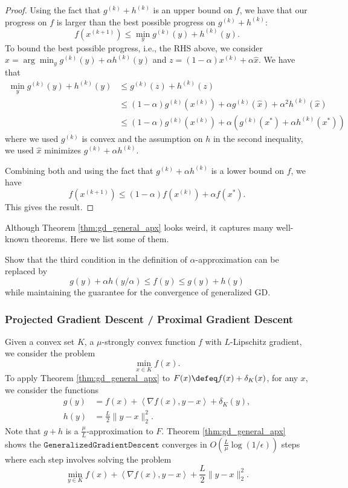 \begin{proof}
Using the fact that $g^{(k)}+h^{(k)}$ is an upper bound on $f$,
we have that our progress on $f$ is larger than the best possible
progress on $g^{(k)}+h^{(k)}$:
\[
f(x^{(k+1)})\leq\min_{y}g^{(k)}(y)+h^{(k)}(y).
\]
To bound the best possible progress, i.e., the RHS above, we consider
$\widehat{x}=\arg\min_{y}g^{(k)}(y)+\alpha h^{(k)}(y)$ and $z=(1-\alpha)x^{(k)}+\alpha\widehat{x}$.
We have that
\begin{align*}
\min_{y}g^{(k)}(y)+h^{(k)}(y) & \leq g^{(k)}(z)+h^{(k)}(z)\\
 & \leq(1-\alpha)g^{(k)}(x^{(k)})+\alpha g^{(k)}(\widehat{x})+\alpha^{2}h^{(k)}(\widehat{x})\\
 & \leq(1-\alpha)g^{(k)}(x^{(k)})+\alpha(g^{(k)}(x^{*})+\alpha h^{(k)}(x^{*}))
\end{align*}
where we used $g^{(k)}$ is convex and the assumption on $h$ in the
second inequality, we used $\widehat{x}$ minimizes $g^{(k)}+\alpha h^{(k)}$.

Combining both and using the fact that $g^{(k)}+\alpha h^{(k)}$ is
a lower bound on $f$, we have
\[
f(x^{(k+1)})\leq(1-\alpha)f(x^{(k)})+\alpha f(x^{*}).
\]
This gives the result.
\end{proof}
Although Theorem \ref{thm:gd_general_apx} looks weird, it captures
many well-known theorems. Here we list some of them.
\begin{xca}
Show that the third condition in the definition of $\alpha$-approximation
can be replaced by 
\[
g(y)+\alpha h(y/\alpha)\leq f(y)\leq g(y)+h(y)
\]
 while maintaining the guarantee for the convergence of generalized
GD.
\end{xca}


\subsubsection*{Projected Gradient Descent / Proximal Gradient Descent}

Given a convex set $K$, a $\mu$-strongly convex function $f$ with
$L$-Lipschitz gradient, we consider the problem
\[
\min_{x\in K}f(x).
\]
To apply Theorem \ref{thm:gd_general_apx} to $F(x)\defeq f(x)+\delta_{K}(x)$,
for any $x$, we consider the functions
\begin{align*}
g(y) & =f(x)+\left\langle \nabla f(x),y-x\right\rangle +\delta_{K}(y),\\
h(y) & =\frac{L}{2}\|y-x\|_{2}^{2}.
\end{align*}
Note that $g+h$ is a $\frac{\mu}{L}$-approximation to $F$. Theorem
\ref{thm:gd_general_apx} shows the $\mathtt{GeneralizedGradientDescent}$
converges in $O(\frac{L}{\mu}\log(1/\epsilon))$ steps where each
step involves solving the problem
\[
\min_{y\in K}f(x)+\left\langle \nabla f(x),y-x\right\rangle +\frac{L}{2}\|y-x\|_{2}^{2}.
\]

